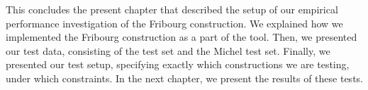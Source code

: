 
This concludes the present chapter that described the setup of our empirical performance investigation of the Fribourg construction. We explained how we implemented the Fribourg construction as a part of the \goal{} tool. Then, we presented our test data, consisting of the \goal{} test set and the Michel test set. Finally, we presented our test setup, specifying exactly which constructions we are testing, under which constraints. In the next chapter, we present the results of these tests.


